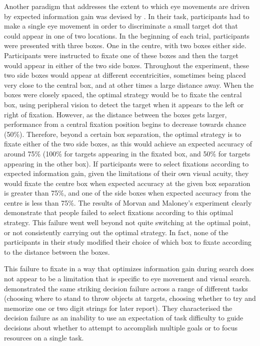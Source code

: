 \documentclass[vision,article,submit,moreauthors,pdftex,10pt,a4paper]{mdpi}
\begin{document}
Another paradigm that addresses the extent to which eye movements are driven by expected information gain was devised by \citeauthor{morvan2012human} \cite{morvan2012human}. In their task, participants had to make a single eye movement in order to discriminate a small target dot that could appear in one of two locations. In the beginning of each trial, participants were presented with three boxes. One in the centre, with two boxes either side. Participants were instructed to fixate one of these boxes and then the target would appear in either of the two side boxes. Throughout the experiment, these two side boxes would appear at different eccentricities, sometimes being placed very close to the central box, and at other times a large distance away. When the boxes were closely spaced, the optimal strategy would be to fixate the central box, using peripheral vision to detect the target when it appears to the left or right of fixation. However, as the distance between the boxes gets larger, performance from a central fixation position begins to decrease towards chance (50\%). Therefore, beyond a certain box separation, the optimal strategy is to fixate either of the two side boxes, as this would achieve an expected accuracy of around 75\% (100\% for targets appearing in the fixated box, and 50\% for targets appearing in the other box). If participants were to select fixations according to expected information gain, given the limitations of their own visual acuity, they would fixate the centre box when expected accuracy at the given box separation is greater than 75\%, and one of the side boxes when expected accuracy from the centre is less than 75\%. The results of Morvan and Maloney’s experiment clearly demonstrate that people failed to select fixations according to this optimal strategy. This failure went well beyond not quite switching at the optimal point, or not consistently carrying out the optimal strategy. In fact, none of the participants in their study modified their choice of which box to fixate according to the distance between the boxes.  

This failure to fixate in a way that optimizes information gain during search does not appear to be a limitation that is specific to eye movement and visual search. \citeauthor{clarke2015failure} \cite{clarke2015failure} demonstrated the same striking decision failure across a range of different tasks (choosing where to stand to throw objects at targets, choosing whether to try and memorize one or two digit strings for later report). They characterised the decision failure as an inability to use an expectation of task difficulty to guide decisions about whether to attempt to accomplish multiple goals or to focus resources on a single task. 
\end{document}
